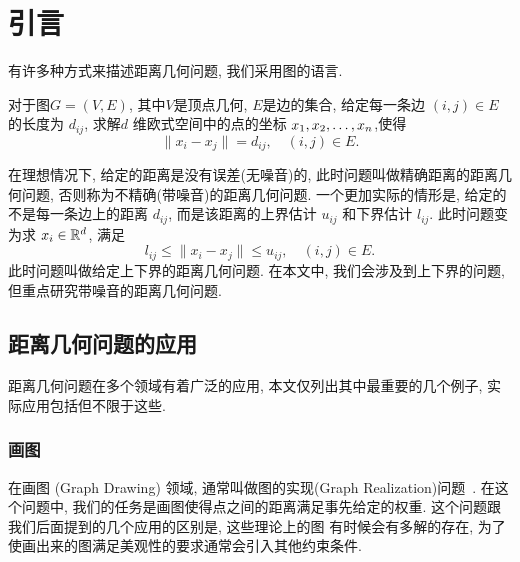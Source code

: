 \documentclass{CASthesis_zzk}
\begin{document}
\setcounter{page}{0}
  

  \tableofcontents
  \listoftables
  \listoffigures
%
%
\mainmatter

%  
%  
%  
%  
%  


\chapter{引言}
\label{cha:introduction}
有许多种方式来描述距离几何问题, 我们采用图的语言. 

\begin{Prob}[等式约束的距离几何问题]
  对于图$G=(V,E)$, 其中$V$是顶点几何, $E$是边的集合, 给定每一条边 $(i,j)\in E$ 的长度为 $d_{ij}$, 求解$d$ 维欧式空间中的点的坐标 $x_1,x_2,\ldots,x_n$,使得
\begin{equation}
  \|x_i-x_j\|=d_{ij}, \quad (i,j)\in E.
\end{equation}
\end{Prob}

在理想情况下, 给定的距离是没有误差(无噪音)的, 
此时问题叫做精确距离的距离几何问题, 否则称为不精确(带噪音)的距离几何问题.
一个更加实际的情形是, 给定的不是每一条边上的距离 $d_{ij}$, 
而是该距离的上界估计 $u_{ij}$ 和下界估计  $l_{ij}$.
此时问题变为求 $x_i\in \mathbb{R} ^d$, 满足
\begin{equation}
  l_{ij}\leq \|x_i-x_j\| \leq u_{ij}, \quad (i,j)\in E.
\end{equation}
此时问题叫做给定上下界的距离几何问题.
在本文中, 我们会涉及到上下界的问题, 但重点研究带噪音的距离几何问题.


\section{距离几何问题的应用}
\label{sec:application}
距离几何问题在多个领域有着广泛的应用, 
本文仅列出其中最重要的几个例子, 实际应用包括但不限于这些.


\subsection{画图}
在画图 (Graph Drawing) 领域, 通常叫做图的实现(Graph Realization)问题~\cite{Gansner2005}.
在这个问题中, 我们的任务是画图使得点之间的距离满足事先给定的权重. 
这个问题跟我们后面提到的几个应用的区别是, 这些理论上的图
有时候会有多解的存在, 为了使画出来的图满足美观性的要求通常会引入其他约束条件.
\end{document}
